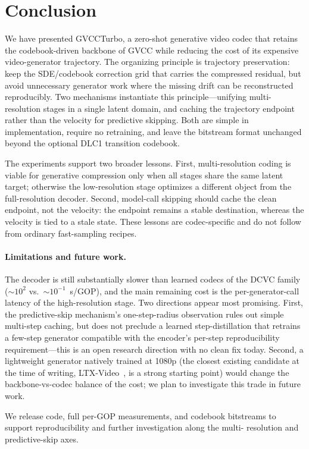 \section{Conclusion}
\label{sec:conclusion}

We have presented GVCCTurbo, a zero-shot generative video codec that retains
the codebook-driven backbone of GVCC while reducing the cost of its expensive
video-generator trajectory. The organizing principle is trajectory
preservation: keep the SDE/codebook correction grid that carries the
compressed residual, but avoid unnecessary generator work where the missing
drift can be reconstructed reproducibly. Two mechanisms instantiate this
principle---unifying multi-resolution stages in a single latent domain, and
caching the trajectory endpoint rather than the velocity for predictive
skipping. Both are simple in implementation, require no retraining, and leave
the bitstream format unchanged beyond the optional DLC1 transition codebook.

The experiments support two broader lessons. First, multi-resolution coding is
viable for generative compression only when all stages share the same latent
target; otherwise the low-resolution stage optimizes a different object from
the full-resolution decoder. Second, model-call skipping should cache the
clean endpoint, not the velocity: the endpoint remains a stable destination,
whereas the velocity is tied to a stale state. These lessons are codec-specific
and do not follow from ordinary fast-sampling recipes.

\paragraph{Limitations and future work.}
The decoder is still substantially slower than learned codecs of the
DCVC family ($\sim 10^2$ vs.\ $\sim 10^{-1}$~s/GOP), and the main
remaining cost is the per-generator-call latency of the high-resolution
stage. Two directions appear most promising. First, the predictive-skip
mechanism's one-step-radius observation rules out simple multi-step
caching, but does not preclude a learned step-distillation that retrains
a few-step generator compatible with the encoder's per-step
reproducibility requirement---this is an open research direction with no
clean fix today. Second, a lightweight generator natively trained at
1080p (the closest existing candidate at the time of writing,
LTX-Video~\cite{ltxvideo2025}, is a strong starting point) would change
the backbone-vs-codec balance of the cost; we plan to investigate this
trade in future work.

We release code, full per-GOP measurements, and codebook bitstreams to
support reproducibility and further investigation along the multi-
resolution and predictive-skip axes.
